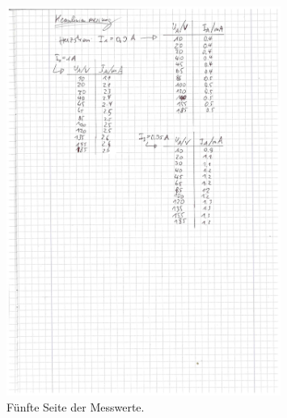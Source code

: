 \begin{figure}
  \centering
  \includegraphics[width=0.8\textwidth]{messwerte/5.pdf}
  \caption{Fünfte Seite der Messwerte.}
  \label{fig:messwert5}
\end{figure}
